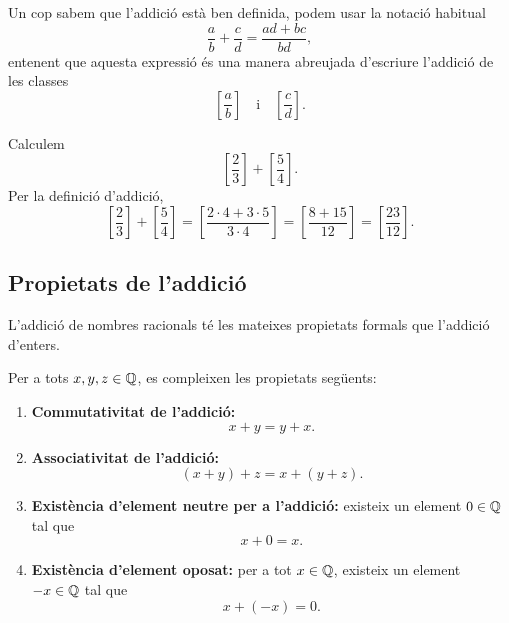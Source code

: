 Un cop sabem que l'addició està ben definida, podem usar la notació habitual
\[
	\frac{a}{b}+\frac{c}{d}
	=
	\frac{ad+bc}{bd},
\]
entenent que aquesta expressió és una manera abreujada d'escriure l'addició de les classes
\[
	\left[\frac{a}{b}\right]
	\quad\text{i}\quad
	\left[\frac{c}{d}\right].
\]

\begin{exemple}
Calculem
\[
	\left[\frac{2}{3}\right]
	+
	\left[\frac{5}{4}\right].
\]
Per la definició d'addició,
\[
	\left[\frac{2}{3}\right]
	+
	\left[\frac{5}{4}\right]
	=
	\left[\frac{2\cdot4+3\cdot5}{3\cdot4}\right]
	=
	\left[\frac{8+15}{12}\right]
	=
	\left[\frac{23}{12}\right].
\]
\end{exemple}

\subsection{Propietats de l'addició}

L'addició de nombres racionals té les mateixes propietats formals que l'addició d'enters.

\begin{proposicio}
Per a tots \(x,y,z\in\mathbb{Q}\), es compleixen les propietats següents:
\begin{enumerate}
	\item \textbf{Commutativitat de l'addició:}
	\[
		x+y=y+x.
	\]

	\item \textbf{Associativitat de l'addició:}
	\[
		(x+y)+z=x+(y+z).
	\]

	\item \textbf{Existència d'element neutre per a l'addició:}
	existeix un element \(0\in\mathbb{Q}\) tal que
	\[
		x+0=x.
	\]

	\item \textbf{Existència d'element oposat:}
	per a tot \(x\in\mathbb{Q}\), existeix un element \(-x\in\mathbb{Q}\) tal que
	\[
		x+(-x)=0.
	\]
\end{enumerate}
\end{proposicio}

